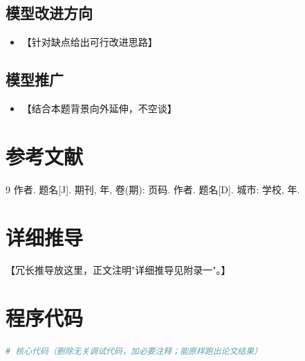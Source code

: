 \documentclass[11pt]{ctexart}
\begin{document}
\subsection{模型改进方向}
\begin{itemize}
  \item 【针对缺点给出可行改进思路】
\end{itemize}
\subsection{模型推广}
\begin{itemize}
  \item 【结合本题背景向外延伸，不空谈】
\end{itemize}

\section{参考文献}
\begin{thebibliography}{9}
   作者. 题名[J]. 期刊, 年, 卷(期): 页码.
   作者. 题名[D]. 城市: 学校, 年.
\end{thebibliography}

\appendix
\section{详细推导}
【冗长推导放这里，正文注明"详细推导见附录一"。】

\section{程序代码}
\begin{lstlisting}[language=Python]
# 核心代码（删除无关调试代码，加必要注释；能原样跑出论文结果）
\end{lstlisting}
\end{document}
